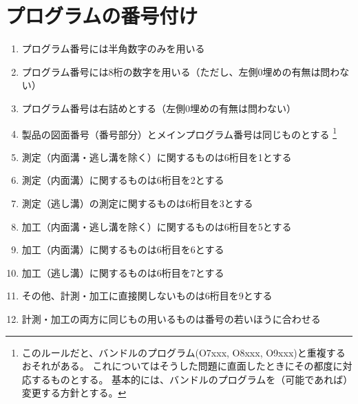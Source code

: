 \section{プログラムの番号付け}
\begin{enumerate}
\item プログラム番号には半角数字のみを用いる
\item プログラム番号には8桁の数字を用いる（ただし、左側0埋めの有無は問わない）
\item プログラム番号は右詰めとする（左側0埋めの有無は問わない）
\item 製品の図面番号（番号部分）とメインプログラム番号は同じものとする
\footnote{このルールだと、バンドルのプログラム(O7xxx, O8xxx, O9xxx)と重複するおそれがある。
これについてはそうした問題に直面したときにその都度に対応するものとする。
基本的には、バンドルのプログラムを（可能であれば）変更する方針とする。}
\item 測定（内面溝・逃し溝を除く）に関するものは6桁目を1とする
\item 測定（内面溝）に関するものは6桁目を2とする
\item 測定（逃し溝）の測定に関するものは6桁目を3とする
\item 加工（内面溝・逃し溝を除く）に関するものは6桁目を5とする
\item 加工（内面溝）に関するものは6桁目を6とする
\item 加工（逃し溝）に関するものは6桁目を7とする
\item その他、計測・加工に直接関しないものは6桁目を9とする
\item 計測・加工の両方に同じもの用いるものは番号の若いほうに合わせる
\end{enumerate}
